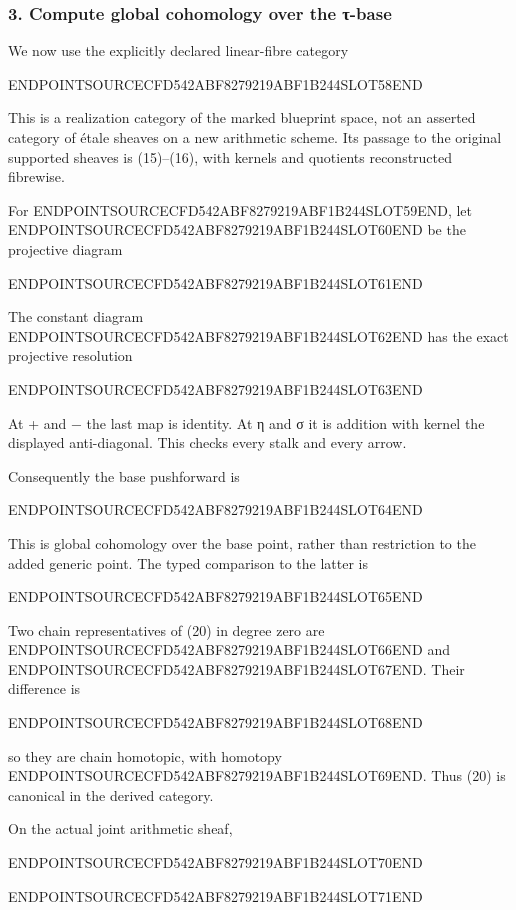 \subsubsection{3. Compute global cohomology over the τ-base}\label{endpoint-tau_base--compute-global-cohomology-over-the-ux3c4-base}

We now use the explicitly declared linear-fibre category

ENDPOINTSOURCECFD542ABF8279219ABF1B244SLOT58END

This is a realization category of the marked blueprint space, not an asserted category of étale sheaves on a new arithmetic scheme. Its passage to the original supported sheaves is (15)--(16), with kernels and quotients reconstructed fibrewise.

For ENDPOINTSOURCECFD542ABF8279219ABF1B244SLOT59END, let ENDPOINTSOURCECFD542ABF8279219ABF1B244SLOT60END be the projective diagram

ENDPOINTSOURCECFD542ABF8279219ABF1B244SLOT61END

The constant diagram ENDPOINTSOURCECFD542ABF8279219ABF1B244SLOT62END has the exact projective resolution

ENDPOINTSOURCECFD542ABF8279219ABF1B244SLOT63END

At + and − the last map is identity. At η and σ it is addition with kernel the displayed anti-diagonal. This checks every stalk and every arrow.

Consequently the base pushforward is

ENDPOINTSOURCECFD542ABF8279219ABF1B244SLOT64END

This is global cohomology over the base point, rather than restriction to the added generic point. The typed comparison to the latter is

ENDPOINTSOURCECFD542ABF8279219ABF1B244SLOT65END

Two chain representatives of (20) in degree zero are ENDPOINTSOURCECFD542ABF8279219ABF1B244SLOT66END and ENDPOINTSOURCECFD542ABF8279219ABF1B244SLOT67END. Their difference is

ENDPOINTSOURCECFD542ABF8279219ABF1B244SLOT68END

so they are chain homotopic, with homotopy ENDPOINTSOURCECFD542ABF8279219ABF1B244SLOT69END. Thus (20) is canonical in the derived category.

On the actual joint arithmetic sheaf,

ENDPOINTSOURCECFD542ABF8279219ABF1B244SLOT70END

ENDPOINTSOURCECFD542ABF8279219ABF1B244SLOT71END

